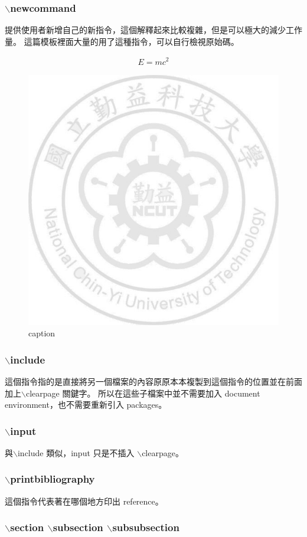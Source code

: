 \subsubsection{$\backslash$newcommand}

提供使用者新增自己的新指令，這個解釋起來比較複雜，但是可以極大的減少工作量。
這篇模板裡面大量的用了這種指令，可以自行檢視原始碼。

\begin{align}
	E = mc^{2} \label{eq:E}
\end{align}

\begin{figure}
	\centering
	\includegraphics[width=.3\textwidth]{ncut_watermark.jpg}
	\caption{caption}
	\label{fig:watermark}
\end{figure}

\subsubsection{$\backslash$include}

這個指令指的是直接將另一個檔案的內容原原本本複製到這個指令的位置並在前面加上$\backslash$clearpage 關鍵字。
所以在這些子檔案中並不需要加入 document environment，也不需要重新引入 packages。

\subsubsection{$\backslash$input}
與$\backslash$include 類似，input 只是不插入 $\backslash$clearpage。

\subsubsection{$\backslash$printbibliography}

這個指令代表著在哪個地方印出 reference。

\subsubsection{$\backslash$section $\backslash$subsection $\backslash$subsubsection}


